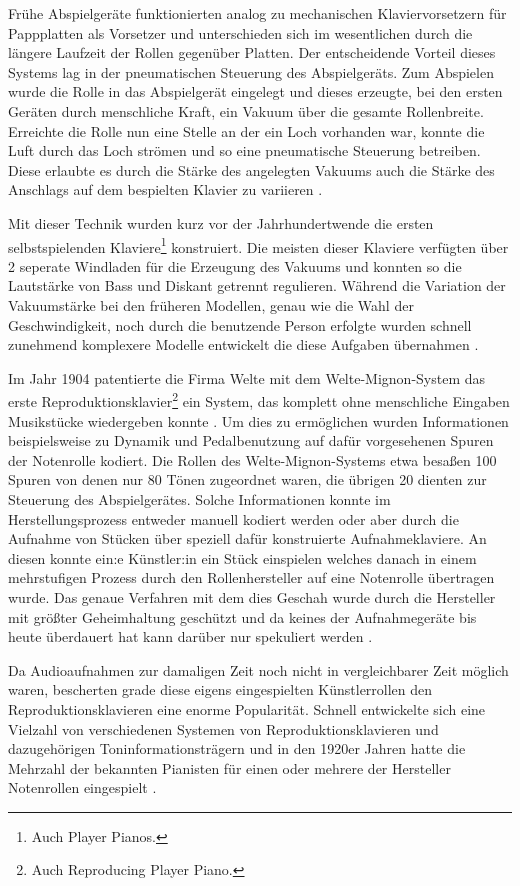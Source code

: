 Frühe Abspielgeräte funktionierten analog zu mechanischen Klaviervorsetzern für Pappplatten als Vorsetzer und unterschieden sich im wesentlichen durch die längere Laufzeit der Rollen gegenüber Platten.
Der entscheidende Vorteil dieses Systems lag in der pneumatischen Steuerung des Abspielgeräts.
Zum Abspielen wurde die Rolle in das Abspielgerät eingelegt und dieses erzeugte, bei den ersten Geräten durch menschliche Kraft, ein Vakuum über die gesamte Rollenbreite.
Erreichte die Rolle nun eine Stelle an der ein Loch vorhanden war, konnte die Luft durch das Loch strömen und so eine pneumatische Steuerung betreiben.
Diese erlaubte es durch die Stärke des angelegten Vakuums auch die Stärke des Anschlags auf dem bespielten Klavier zu variieren \parencite[]{mgg_mechanische}.

Mit dieser Technik wurden kurz vor der Jahrhundertwende die ersten selbstspielenden Klaviere\footnote{Auch Player Pianos.} konstruiert.
Die meisten dieser Klaviere verfügten über 2 seperate Windladen für die Erzeugung des Vakuums und konnten so die Lautstärke von Bass und Diskant getrennt regulieren.
Während die Variation der Vakuumstärke bei den früheren Modellen, genau wie die Wahl der Geschwindigkeit, noch durch die benutzende Person erfolgte wurden schnell zunehmend komplexere Modelle entwickelt die diese Aufgaben übernahmen \parencite[]{mgg_mechanische}.

Im Jahr 1904 patentierte die Firma Welte mit dem Welte-Mignon-System das erste Reproduktionsklavier\footnote{Auch Reproducing Player Piano.} ein System, das komplett ohne menschliche Eingaben Musikstücke wiedergeben konnte \parencite[]{mgg_mechanische}.
Um dies zu ermöglichen wurden Informationen beispielsweise zu Dynamik und Pedalbenutzung auf dafür vorgesehenen Spuren der Notenrolle kodiert.
Die Rollen des Welte-Mignon-Systems etwa besaßen 100 Spuren von denen nur 80 Tönen zugeordnet waren, die übrigen 20 dienten zur Steuerung des Abspielgerätes.
Solche Informationen konnte im Herstellungsprozess entweder manuell kodiert werden oder aber durch die Aufnahme von Stücken über speziell dafür konstruierte Aufnahmeklaviere.
An diesen konnte ein:e Künstler:in ein Stück einspielen welches danach in einem mehrstufigen Prozess durch den Rollenhersteller auf eine Notenrolle übertragen wurde.
Das genaue Verfahren mit dem dies Geschah wurde durch die Hersteller mit größter Geheimhaltung geschützt und da keines der Aufnahmegeräte bis heute überdauert hat kann darüber nur spekuliert werden \parencite[]{zoltan_1994}.

Da Audioaufnahmen zur damaligen Zeit noch nicht in vergleichbarer Zeit möglich waren, bescherten grade diese eigens eingespielten Künstlerrollen den Reproduktionsklavieren eine enorme Popularität.
Schnell entwickelte sich eine Vielzahl von verschiedenen Systemen von Reproduktionsklavieren und dazugehörigen Toninformationsträgern und in den 1920er Jahren hatte die Mehrzahl der bekannten Pianisten für einen oder mehrere der Hersteller Notenrollen eingespielt \parencite[]{bowers_1972}.


